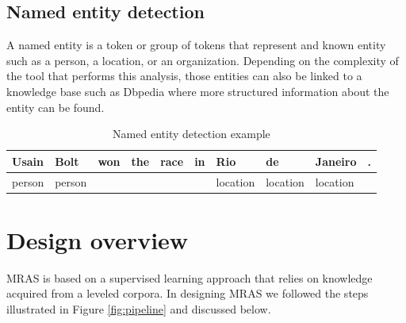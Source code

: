 \documentclass{bsu-ms}
\newcommand{\projectName}{MRAS\xspace}
\begin{document}
\subsection{Named entity detection}
A named entity is a token or group of tokens that represent and known entity such as a person, a location, or an organization. Depending on the complexity of the tool that performs this analysis, those entities can also be linked to a knowledge base such as Dbpedia \cite{dbpedia} where more structured information about the entity can be found.




\begin{table}[h]
\centering
\begin{tabular}{|l|l|l|l|l|l|l|l|l|l|}
\hline
Usain & Bolt & won & the & race & in & Rio & de & Janeiro & . \\ \hline
person & person &   &   &   &   & location & location & location &   \\ \hline
\end{tabular}
\caption{Named entity detection example}
\label{tab:postagging}
\end{table}


\section{Design overview}
\label{sec:overview}





\projectName is based on a supervised learning approach that relies on knowledge acquired from a leveled corpora. In designing \projectName we followed the steps illustrated in Figure \ref{fig:pipeline} and discussed below.
\end{document}
